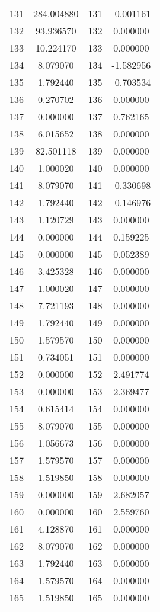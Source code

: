 \documentclass[12pt]{article}
\begin{document}
\begin{longtable}{@{}cccc@{}}
131 & 284.004880 & 131 & -0.001161 \\
132 & 93.936570 & 132 & 0.000000 \\
133 & 10.224170 & 133 & 0.000000 \\
134 & 8.079070 & 134 & -1.582956 \\
135 & 1.792440 & 135 & -0.703534 \\
136 & 0.270702 & 136 & 0.000000 \\
137 & 0.000000 & 137 & 0.762165 \\
138 & 6.015652 & 138 & 0.000000 \\
139 & 82.501118 & 139 & 0.000000 \\
140 & 1.000020 & 140 & 0.000000 \\
141 & 8.079070 & 141 & -0.330698 \\
142 & 1.792440 & 142 & -0.146976 \\
143 & 1.120729 & 143 & 0.000000 \\
144 & 0.000000 & 144 & 0.159225 \\
145 & 0.000000 & 145 & 0.052389 \\
146 & 3.425328 & 146 & 0.000000 \\
147 & 1.000020 & 147 & 0.000000 \\
148 & 7.721193 & 148 & 0.000000 \\
149 & 1.792440 & 149 & 0.000000 \\
150 & 1.579570 & 150 & 0.000000 \\
151 & 0.734051 & 151 & 0.000000 \\
152 & 0.000000 & 152 & 2.491774 \\
153 & 0.000000 & 153 & 2.369477 \\
154 & 0.615414 & 154 & 0.000000 \\
155 & 8.079070 & 155 & 0.000000 \\
156 & 1.056673 & 156 & 0.000000 \\
157 & 1.579570 & 157 & 0.000000 \\
158 & 1.519850 & 158 & 0.000000 \\
159 & 0.000000 & 159 & 2.682057 \\
160 & 0.000000 & 160 & 2.559760 \\
161 & 4.128870 & 161 & 0.000000 \\
162 & 8.079070 & 162 & 0.000000 \\
163 & 1.792440 & 163 & 0.000000 \\
164 & 1.579570 & 164 & 0.000000 \\
165 & 1.519850 & 165 & 0.000000 \\

\end{longtable}
\end{document}
